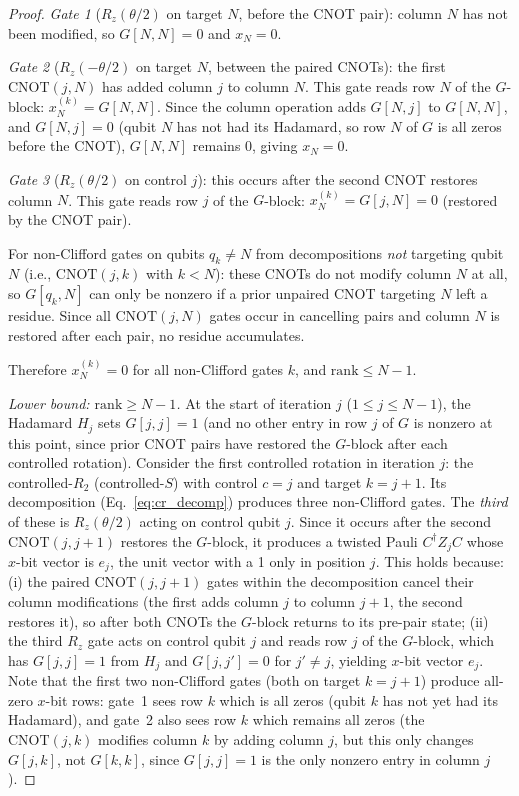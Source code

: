 \documentclass[a4paper,twocolumn,11pt]{quantumarticle}
\begin{document}
\begin{proof}
\emph{Gate 1} ($R_z(\theta/2)$ on target $N$, before the CNOT pair): column $N$ has not been modified, so $G[N, N] = 0$ and $x_N = 0$.

\emph{Gate 2} ($R_z(-\theta/2)$ on target $N$, between the paired CNOTs): the first $\mathrm{CNOT}(j, N)$ has added column $j$ to column $N$.
This gate reads row $N$ of the $G$-block: $x^{(k)}_N = G[N, N]$.
Since the column operation adds $G[N, j]$ to $G[N, N]$, and $G[N, j] = 0$ (qubit $N$ has not had its Hadamard, so row $N$ of $G$ is all zeros before the CNOT), $G[N, N]$ remains $0$, giving $x_N = 0$.

\emph{Gate 3} ($R_z(\theta/2)$ on control $j$): this occurs after the second CNOT restores column $N$.
This gate reads row $j$ of the $G$-block: $x^{(k)}_N = G[j, N] = 0$ (restored by the CNOT pair).

For non-Clifford gates on qubits $q_k \ne N$ from decompositions \emph{not} targeting qubit $N$ (i.e., $\mathrm{CNOT}(j, k)$ with $k < N$): these CNOTs do not modify column $N$ at all, so $G[q_k, N]$ can only be nonzero if a prior unpaired CNOT targeting $N$ left a residue.
Since all $\mathrm{CNOT}(j, N)$ gates occur in cancelling pairs and column $N$ is restored after each pair, no residue accumulates.

Therefore $x^{(k)}_N = 0$ for all non-Clifford gates $k$, and $\mathrm{rank} \le N - 1$.

\medskip
\noindent\emph{Lower bound: $\mathrm{rank} \ge N - 1$.}\quad
At the start of iteration $j$ ($1 \le j \le N - 1$), the Hadamard $H_j$ sets $G[j, j] = 1$ (and no other entry in row $j$ of $G$ is nonzero at this point, since prior CNOT pairs have restored the $G$-block after each controlled rotation).
Consider the first controlled rotation in iteration $j$: the controlled-$R_2$ (controlled-$S$) with control $c = j$ and target $k = j + 1$.
Its decomposition (Eq.~\eqref{eq:cr_decomp}) produces three non-Clifford gates.
The \emph{third} of these is $R_z(\theta/2)$ acting on control qubit $j$. Since it occurs after the second $\mathrm{CNOT}(j, j{+}1)$ restores the $G$-block, it produces a twisted Pauli $C^\dagger Z_j C$ whose $x$-bit vector is $e_j$, the unit vector with a 1 only in position $j$.
This holds because: (i) the paired $\mathrm{CNOT}(j, j{+}1)$ gates within the decomposition cancel their column modifications (the first adds column $j$ to column $j{+}1$, the second restores it), so after both CNOTs the $G$-block returns to its pre-pair state; (ii) the third $R_z$ gate acts on control qubit $j$ and reads row $j$ of the $G$-block, which has $G[j, j] = 1$ from $H_j$ and $G[j, j'] = 0$ for $j' \ne j$, yielding $x$-bit vector $e_j$.
Note that the first two non-Clifford gates (both on target $k = j + 1$) produce all-zero $x$-bit rows: gate~1 sees row $k$ which is all zeros (qubit $k$ has not yet had its Hadamard), and gate~2 also sees row $k$ which remains all zeros (the $\mathrm{CNOT}(j,k)$ modifies column $k$ by adding column $j$, but this only changes $G[j, k]$, not $G[k, k]$, since $G[j, j] = 1$ is the only nonzero entry in column $j$).


\end{proof}
\end{document}
